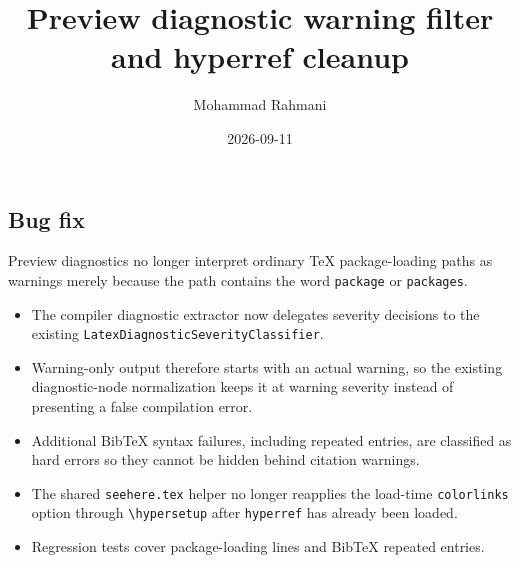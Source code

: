 \documentclass[a4paper]{article}
\title{Preview diagnostic warning filter and hyperref cleanup}
\date{2026-09-11}
\author{Mohammad Rahmani}
\begin{document}
   \maketitle

   \begin{preview}
      \section*{Bug fix}

      Preview diagnostics no longer interpret ordinary TeX package-loading
      paths as warnings merely because the path contains the word
      \verb|package| or \verb|packages|.

      \begin{itemize}
         \item The compiler diagnostic extractor now delegates severity
         decisions to the existing \verb|LatexDiagnosticSeverityClassifier|.
         \item Warning-only output therefore starts with an actual warning, so
         the existing diagnostic-node normalization keeps it at warning
         severity instead of presenting a false compilation error.
         \item Additional BibTeX syntax failures, including repeated entries,
         are classified as hard errors so they cannot be hidden behind citation
         warnings.
         \item The shared \verb|seehere.tex| helper no longer reapplies the
         load-time \verb|colorlinks| option through \verb|\hypersetup| after
         \verb|hyperref| has already been loaded.
         \item Regression tests cover package-loading lines and BibTeX repeated
         entries.
      \end{itemize}
   \end{preview}

   
   
\end{document}
